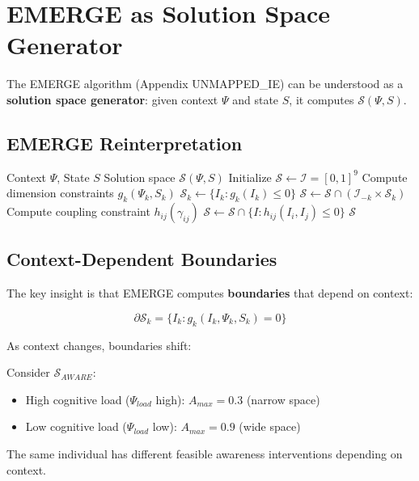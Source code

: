\section{EMERGE as Solution Space Generator}
\label{sec:ss-emerge}

The EMERGE algorithm (Appendix UNMAPPED_IE) can be understood as a \textbf{solution space generator}: given context $\Psi$ and state $S$, it computes $\mathcal{S}(\Psi, S)$.

\subsection{EMERGE Reinterpretation}

\begin{algorithm}[H]
\caption{EMERGE as Solution Space Generator}
\begin{algorithmic}[1]
\REQUIRE Context $\Psi$, State $S$
\ENSURE Solution space $\mathcal{S}(\Psi, S)$
\STATE Initialize $\mathcal{S} \leftarrow \mathcal{I} = [0,1]^9$ 
    \STATE Compute dimension constraints $g_k(\Psi_k, S_k)$
    \STATE $\mathcal{S}_k \leftarrow \{I_k : g_k(I_k) \leq 0\}$
    \STATE $\mathcal{S} \leftarrow \mathcal{S} \cap (\mathcal{I}_{-k} \times \mathcal{S}_k)$ 
\ENDFOR
{}
    \STATE Compute coupling constraint $h_{ij}(\gamma_{ij})$
    \STATE $\mathcal{S} \leftarrow \mathcal{S} \cap \{I : h_{ij}(I_i, I_j) \leq 0\}$ 
\ENDFOR
\RETURN $\mathcal{S}$
\end{algorithmic}
\end{algorithm}

\subsection{Context-Dependent Boundaries}

The key insight is that EMERGE computes \textbf{boundaries} that depend on context:

\begin{equation}
\partial \mathcal{S}_k = \{I_k : g_k(I_k, \Psi_k, S_k) = 0\}
\end{equation}

As context changes, boundaries shift:

\begin{example}
Consider $\mathcal{S}_{AWARE}$:
\begin{itemize}
    \item High cognitive load ($\Psi_{load}$ high): $A_{max} = 0.3$ (narrow space)
    \item Low cognitive load ($\Psi_{load}$ low): $A_{max} = 0.9$ (wide space)
\end{itemize}
The same individual has different feasible awareness interventions depending on context.
\end{example}

